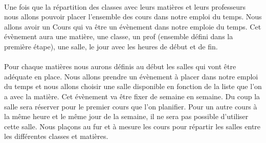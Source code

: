 \documentclass[12]{article}
\begin{document}

		\paragraph{}
		Une fois que la répartition des classes avec leurs matières et leurs professeurs nous allons pouvoir placer l'ensemble des cours dans notre emploi du temps. Nous allons avoir un Cours qui va être un évènement dans notre emploie du temps. Cet évènement aura une matière, une classe, un prof (ensemble défini dans la première étape), une salle, le jour avec les heures de début et de fin.
	
		\paragraph{}
		Pour chaque matières nous aurons définis au début les salles qui vont être adéquate en place. Nous allons prendre un évènement à placer dans notre emploi du temps et nous allons choisir une salle disponible en fonction de la liste que l'on a avec la matière. Cet évènement va être fixer de semaine en semaine. Du coup la salle sera réserver pour le premier cours que l'on planifier. Pour un autre cours à la même heure et le même jour de la semaine, il ne sera pas possible d'utiliser cette salle. Nous plaçons au fur et à mesure les cours pour répartir les salles entre les différentes classes et matières.
		 
\end{document}
